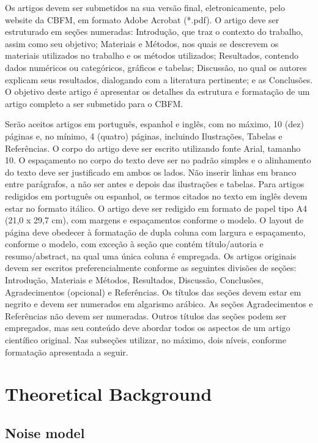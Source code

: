 \documentclass[10pt,twoside,twocolumn]{article}
\begin{document}
Os artigos devem ser submetidos na sua versão final, eletronicamente, pelo website da CBFM, em formato Adobe Acrobat (*.pdf).
O artigo deve ser estruturado em seções numeradas: Introdução, que traz o contexto do trabalho, assim como seu objetivo; Materiais e Métodos, nos quais se descrevem os materiais utilizados no trabalho e os métodos utilizados; Resultados, contendo dados numéricos ou categóricos, gráficos e tabelas; Discussão, no qual os autores explicam seus resultados, dialogando com a literatura pertinente; e as Conclusões.
O objetivo deste artigo é apresentar os detalhes da estrutura e formatação de um artigo completo a ser submetido para o CBFM.

Serão aceitos artigos em português, espanhol e inglês, com no máximo, 10 (dez) páginas e, no mínimo, 4 (quatro) páginas, incluindo Ilustrações, Tabelas e Referências. O corpo do artigo deve ser escrito utilizando fonte Arial, tamanho 10. O espaçamento no corpo do texto deve ser no padrão simples e o alinhamento do texto deve ser justificado em ambos os lados. Não inserir linhas em branco entre parágrafos, a não ser antes e depois das ilustrações e tabelas. Para artigos redigidos em português ou espanhol, os termos citados no texto em inglês devem estar no formato itálico.
O artigo deve ser redigido em formato de papel tipo A4 (21,0 x 29,7 cm), com margens e espaçamentos conforme o modelo. O layout de página deve obedecer à formatação de dupla coluna com largura e espaçamento, conforme o modelo, com exceção à seção que contém título/autoria e resumo/abstract, na qual uma única coluna é empregada.
Os artigos originais devem ser escritos preferencialmente conforme as seguintes divisões de seções: Introdução, Materiais e Métodos, Resultados, Discussão, Conclusões, Agradecimentos (opcional) e Referências. Os títulos das seções devem estar em negrito e devem ser numerados em algarismo arábico. As seções Agradecimentos e Referências não devem ser numeradas. Outros títulos das seções podem ser empregados, mas seu conteúdo deve abordar todos os aspectos de um artigo científico original. Nas subseções utilizar, no máximo, dois níveis, conforme formatação apresentada a seguir.



\section{Theoretical Background}

\subsection{Noise model}
\end{document}
